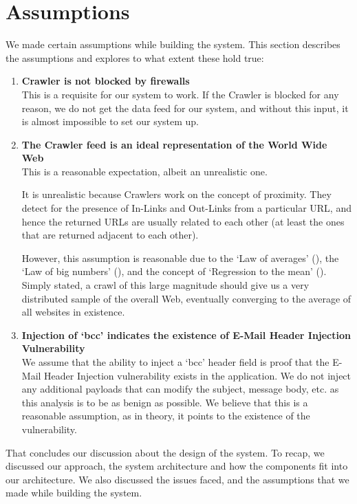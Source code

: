 \section{Assumptions}
We made certain assumptions while building the system. This section describes the assumptions and explores to what extent these hold true:
\begin{enumerate}
	\item \textbf{Crawler is not blocked by firewalls}\\
	This is a requisite for our system to work. If the Crawler is blocked for any reason, we do not get the data feed for our system, and without this input, it is almost impossible to set our system up.
	\item \textbf{The Crawler feed is an ideal representation of the World Wide Web} \\
	This is a reasonable expectation, albeit an unrealistic one.
	
	It is unrealistic because Crawlers work on the concept of proximity. They detect for the presence of In-Links and Out-Links from a particular URL, and hence the returned URLs are usually related to each other (at least the ones that are returned adjacent to each other).
	
	However, this assumption is reasonable due to the `Law of averages' (\cite{wiki:Law_of_averages}), the `Law of big numbers' (\cite{wiki:Law_of_large_numbers}), and the concept of `Regression to the mean' (\cite{wiki:Regression_toward_the_mean}). Simply stated, a crawl of this large magnitude should give us a very distributed sample of the overall Web, eventually converging to the average of all websites in existence.
	
	\item \textbf{Injection of `bcc' indicates the existence of E-Mail Header Injection Vulnerability} \\
	We assume that the ability to inject a `bcc' header field is proof that the E-Mail Header Injection vulnerability exists in the application. We do not inject any additional payloads that can modify the subject, message body, etc. as this analysis is to be as benign as possible.
	We believe that this is a reasonable assumption, as in theory, it points to the existence of the vulnerability.
\end{enumerate}

That concludes our discussion about the design of the system. To recap, we discussed our approach, the system architecture and how the components fit into our architecture. We also discussed the issues faced, and the assumptions that we made while building the system. %